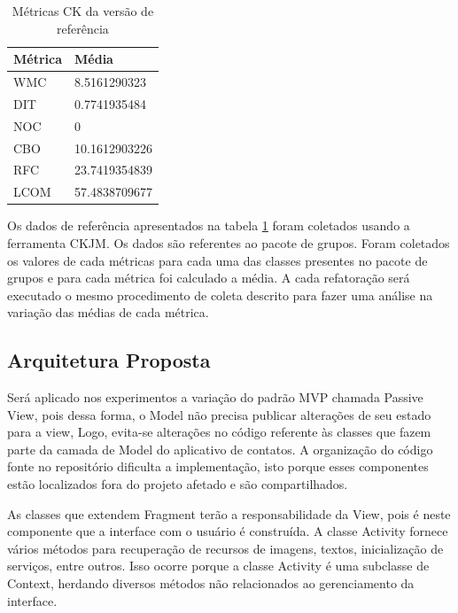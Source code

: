 \documentclass[conference]{IEEEtran}
\begin{document}
\begin{table}[!h]
	\centering
	    \caption{\label{tab:dados_baseline} Métricas CK da versão de referência}
	
    \begin{tabular}{ | l | l | }
    \hline
    Métrica &	Média \\ \hline
    WMC  	&	8.5161290323   	\\ \hline
    DIT	 	&	0.7741935484	\\ \hline
	NOC  	& 	0				\\ \hline
	CBO	  	& 	10.1612903226	\\ \hline
	RFC	 	& 	23.7419354839	\\ \hline
	LCOM 	& 	57.4838709677	\\ \hline
    \end{tabular}
    
\end{table}


Os dados de referência apresentados na tabela \ref{tab:dados_baseline} foram
coletados usando a ferramenta CKJM. Os dados são referentes ao pacote de grupos.
Foram coletados os valores de cada métricas para cada uma das classes presentes
no pacote de grupos e para cada métrica foi calculado a média. A cada
refatoração será executado o mesmo procedimento de coleta descrito para fazer
uma análise na variação das médias de cada métrica.


\subsection{Arquitetura Proposta}

Será aplicado nos experimentos a variação do padrão MVP chamada Passive View,
pois dessa forma, o Model não precisa publicar alterações de seu estado para a
view, Logo, evita-se alterações no código referente às classes que fazem
parte da camada de Model do aplicativo de contatos. A organização do código
fonte no repositório dificulta a implementação, isto porque esses componentes estão
localizados fora do projeto afetado e são compartilhados.

As classes que extendem Fragment terão a responsabilidade da View, pois é neste
componente que a interface com o usuário é construída. A classe Activity fornece
vários métodos para recuperação de recursos de imagens, textos, inicialização de
serviços, entre outros. Isso ocorre porque a classe Activity é uma subclasse de Context, herdando diversos métodos não relacionados ao gerenciamento da interface.
\end{document}
